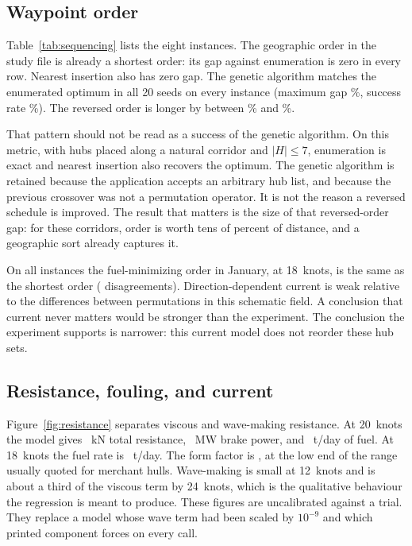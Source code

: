 \documentclass[11pt]{article}
\begin{document}
\subsection{Waypoint order}
Table~\ref{tab:sequencing} lists the eight instances.
The geographic order in the study file is already a shortest order: its gap against enumeration is zero in every row.
Nearest insertion also has zero gap.
The genetic algorithm matches the enumerated optimum in all 20 seeds on every instance (maximum gap \GaMaxGap\%, success rate \GaMinSuccess\%).
The reversed order is longer by between \ReversedGapMin\% and \ReversedGapMax\%.

That pattern should not be read as a success of the genetic algorithm.
On this metric, with hubs placed along a natural corridor and \(|H|\le 7\), enumeration is exact and nearest insertion also recovers the optimum.
The genetic algorithm is retained because the application accepts an arbitrary hub list, and because the previous crossover was not a permutation operator.
It is not the reason a reversed schedule is improved.
The result that matters is the size of that reversed-order gap: for these corridors, order is worth tens of percent of distance, and a geographic sort already captures it.

On all \NInstances{} instances the fuel-minimizing order in January, at 18~knots, is the same as the shortest order (\NCurrentOrderChanges{} disagreements).
Direction-dependent current is weak relative to the differences between permutations in this schematic field.
A conclusion that current never matters would be stronger than the experiment.
The conclusion the experiment supports is narrower: this current model does not reorder these hub sets.



\subsection{Resistance, fouling, and current}
Figure~\ref{fig:resistance} separates viscous and wave-making resistance.
At 20~knots the model gives \ResistanceTwenty~kN total resistance, \PowerTwenty~MW brake power, and \FuelTwenty~t/day of fuel.
At 18~knots the fuel rate is \FuelEighteen~t/day.
The form factor is \FormFactor, at the low end of the range usually quoted for merchant hulls.
Wave-making is small at 12~knots and is about a third of the viscous term by 24~knots, which is the qualitative behaviour the regression is meant to produce.
These figures are uncalibrated against a trial.
They replace a model whose wave term had been scaled by \(10^{-9}\) and which printed component forces on every call.
\end{document}
